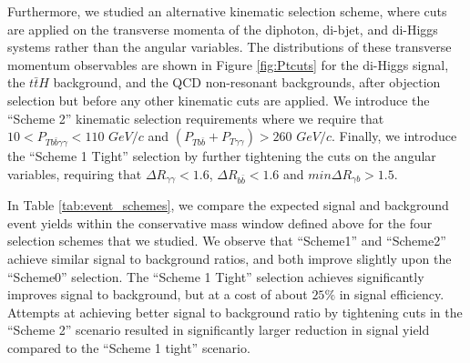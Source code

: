 \documentclass{cmspaper}
\begin{document}
Furthermore, we studied an alternative kinematic selection scheme, where cuts are applied
on the transverse momenta of the diphoton, di-bjet, and di-Higgs systems rather than the angular variables.
The distributions of these transverse momentum observables are shown in Figure \ref{fig:Ptcuts} for the 
di-Higgs signal, the  $t\bar{t}H$ background, and the QCD non-resonant backgrounds, after objection
selection but before any other kinematic cuts are applied. We introduce the ``Scheme 2'' 
kinematic selection requirements where we require that $10 < P_{Tb\bar{b}\gamma\gamma} < 110$ $GeV/c$ 
and $(P_{Tb\bar{b}}+P_{T\gamma\gamma})>260$ $GeV/c$. 
Finally, we introduce the ``Scheme 1 Tight'' selection by further tightening the 
cuts on the angular variables, requiring that $\Delta R_{\gamma\gamma} < 1.6$, 
$\Delta R_{b\bar{b}}<1.6$ and $min\Delta R_{\gamma b} > 1.5$. 

In Table \ref{tab:event_schemes}, we compare the expected signal and background event yields
within the conservative mass window defined above for the four selection schemes that we studied. 
We observe that ``Scheme1'' and ``Scheme2'' achieve similar signal to background ratios, and both
improve slightly upon the ``Scheme0'' selection. The ``Scheme 1 Tight'' selection achieves
significantly improves signal to background, but at a cost of about $25\%$ in signal efficiency.
Attempts at achieving better signal to background ratio by tightening cuts in the ``Scheme 2''
scenario resulted in significantly larger reduction in signal yield compared to the ``Scheme 1 tight''
scenario. 
\end{document}
